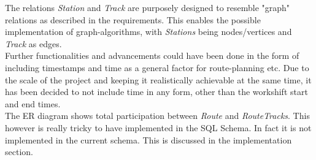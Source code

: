 \newpage

The relations \emph{Station} and \emph{Track} are purposely designed to resemble "graph" relations as described in the requirements. This enables the possible implementation of graph-algorithms, with \emph{Stations} being nodes/vertices and \emph{Track} as edges.
\\[12pt]
Further functionalities and advancements could have been done in the form of including timestamps and time as a general factor for route-planning etc. Due to the scale of the project and keeping it realistically achievable at the same time, it has been decided to not include time in any form, other than the workshift start and end times.\\
The ER diagram shows total participation between \emph{Route} and \emph{RouteTracks}. This however is really tricky to have implemented in the SQL Schema. In fact it is not implemented in the current schema. This is discussed in the implementation section.